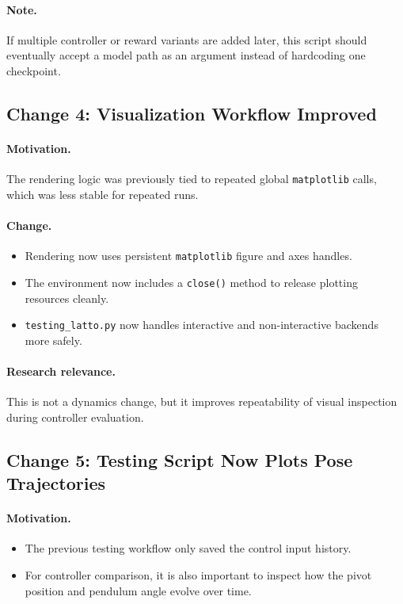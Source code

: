 \documentclass[11pt]{article}
\begin{document}
\paragraph{Note.}
If multiple controller or reward variants are added later, this script should eventually accept a model path as an argument instead of hardcoding one checkpoint.

\subsection*{Change 4: Visualization Workflow Improved}

\paragraph{Motivation.}
The rendering logic was previously tied to repeated global \texttt{matplotlib} calls, which was less stable for repeated runs.

\paragraph{Change.}
\begin{itemize}[leftmargin=1.5em]
  \item Rendering now uses persistent \texttt{matplotlib} figure and axes handles.
  \item The environment now includes a \texttt{close()} method to release plotting resources cleanly.
  \item \texttt{testing\_latto.py} now handles interactive and non-interactive backends more safely.
\end{itemize}

\paragraph{Research relevance.}
This is not a dynamics change, but it improves repeatability of visual inspection during controller evaluation.

\subsection*{Change 5: Testing Script Now Plots Pose Trajectories}

\paragraph{Motivation.}
\begin{itemize}[leftmargin=1.5em]
  \item The previous testing workflow only saved the control input history.
  \item For controller comparison, it is also important to inspect how the pivot position and pendulum angle evolve over time.
\end{itemize}
\end{document}
